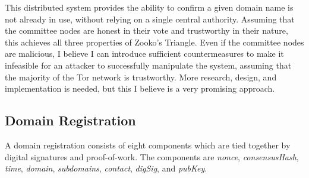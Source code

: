 This distributed system provides the ability to confirm a given domain name is not already in use, without relying on a single central authority. Assuming that the committee nodes are honest in their vote and trustworthy in their nature, this achieves all three properties of Zooko's Triangle. Even if the committee nodes are malicious, I believe I can introduce sufficient countermeasures to make it infeasible for an attacker to successfully manipulate the system, assuming that the majority of the Tor network is trustworthy. More research, design, and implementation is needed, but this I believe is a very promising approach.




\subsection{Domain Registration}

A domain registration consists of eight components which are tied together by digital signatures and proof-of-work. The components are \textit{nonce}, \textit{consensusHash}, \textit{time}, \textit{domain}, \textit{subdomains}, \textit{contact}, \textit{digSig}, and \textit{pubKey}.

